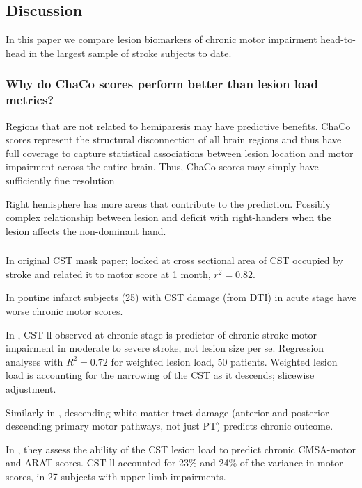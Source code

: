 \documentclass[10pt]{article}
\begin{document}
 
\subsection*{Discussion}

In this paper we compare lesion biomarkers of chronic motor impairment head-to-head in the largest sample of stroke subjects to date. 

\subsubsection*{Why do ChaCo scores perform better than lesion load metrics?}

Regions that are not related to hemiparesis may have predictive benefits. ChaCo scores represent the structural disconnection of all brain regions and thus have full coverage to capture statistical associations between lesion location and motor impairment across the entire brain. Thus, ChaCo scores may simply have sufficiently fine resolution 




Right hemisphere has more areas that contribute to the prediction. Possibly complex relationship between lesion and deficit with right-handers when the lesion affects the non-dominant hand.




\subsubsection*{}
In \cite{Pineiro2000-dv} original CST mask paper; looked at cross sectional area of CST occupied by stroke and related it to motor score at 1 month, $r^2 = 0.82$.

In \cite{Jang2008-ns} pontine infarct subjects (25) with CST damage (from DTI) in acute stage have worse chronic motor scores. 

In \cite{Zhu2010-qh}, CST-ll observed at chronic stage is predictor of chronic stroke motor impairment in moderate to severe stroke, not lesion size per se. Regression analyses with $R^2 = 0.72$ for weighted lesion load, 50 patients. Weighted lesion load is accounting for the narrowing of the CST as it descends; slicewise adjustment. 

Similarly in \cite{Lindenberg2010-pa}, descending white matter tract damage (anterior and posterior descending primary motor pathways, not just PT) predicts chronic outcome.

In \cite{Lam2018-xh}, they assess the ability of the CST lesion load to predict chronic CMSA-motor and ARAT scores. CST ll accounted for 23$\%$ and 24$\%$ of the variance in motor scores, in 27 subjects with upper limb impairments.
\end{document}
